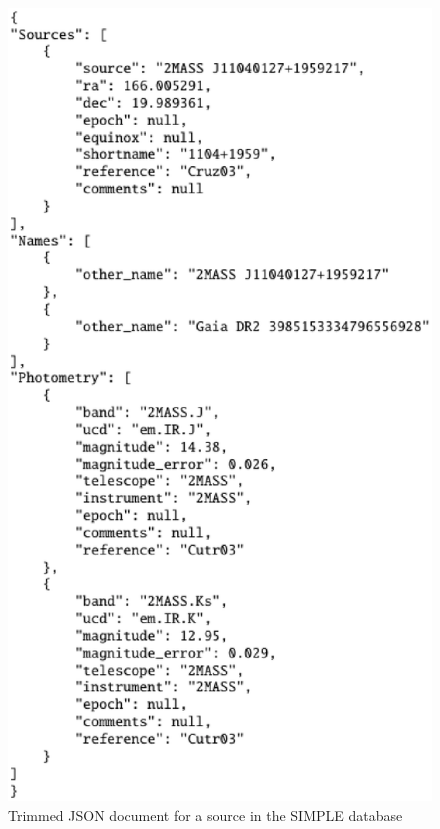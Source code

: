 \documentclass[iop,revtex4,natbib209]{emulateapj}
\begin{document}
\begin{figure}
    \centering
    \includegraphics[height=0.9\textheight]{X0-012_f2.eps}
    \caption{Trimmed JSON document for a source in the SIMPLE database}
    \label{fig:json}
\end{figure}
\end{document}
